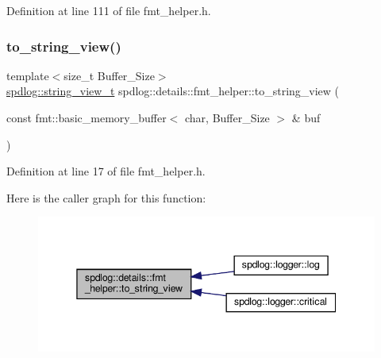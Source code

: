 Definition at line 111 of file fmt\+\_\+helper.\+h.

\mbox{\label{namespacespdlog_1_1details_1_1fmt__helper_aa2b4191cb8c40474fb61787ad67face5}} 
\subsubsection{\texorpdfstring{to\+\_\+string\+\_\+view()}{to\_string\_view()}}
{\footnotesize\ttfamily template$<$size\+\_\+t Buffer\+\_\+\+Size$>$ \\
\hyperlink{namespacespdlog_af48e310b2f366ac6544701e6a3b56247}{spdlog\+::string\+\_\+view\+\_\+t} spdlog\+::details\+::fmt\+\_\+helper\+::to\+\_\+string\+\_\+view (\begin{DoxyParamCaption}\item[{const fmt\+::basic\+\_\+memory\+\_\+buffer$<$ char, Buffer\+\_\+\+Size $>$ \&}]{buf }\end{DoxyParamCaption})\hspace{0.3cm}{\ttfamily [inline]}}



Definition at line 17 of file fmt\+\_\+helper.\+h.

Here is the caller graph for this function\+:
\nopagebreak
\begin{figure}[H]
\begin{center}
\leavevmode
\includegraphics[width=345pt]{namespacespdlog_1_1details_1_1fmt__helper_aa2b4191cb8c40474fb61787ad67face5_icgraph}
\end{center}
\end{figure}
